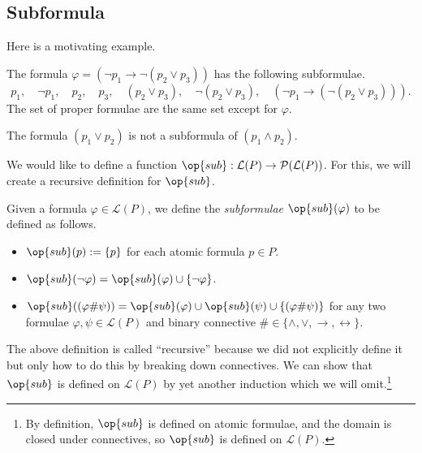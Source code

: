 \subsection{Subformula}
Here is a motivating example.
\begin{example}
	The formula $\varphi=(\lnot p_1\to\lnot(p_2\lor p_3))$ has the following subformulae.
	\[p_1,\quad\lnot p_1,\quad p_2,\quad p_3,\quad(p_2\lor p_3),\quad\lnot(p_2\lor p_3),\quad(\lnot p_1\to(\lnot(p_2\lor p_3))).\]
	The set of proper formulae are the same set except for $\varphi$.
\end{example}
\begin{nex}
	The formula $(p_1\lor p_2)$ is not a subformula of $(p_1\land p_2)$.
\end{nex}
We would like to define a function $\op{sub}:\mathcal L(P)\to\mathcal P(\mathcal L(P))$. For this, we will create a recursive definition for $\op{sub}$.
\begin{definition}[Subformula]
	Given a formula $\varphi\in\mathcal L(P)$, we define the \textit{subformulae} $\op{sub}(\varphi)$ to be defined as follows.
	\begin{itemize}
		\item $\op{sub}(p):=\{p\}$ for each atomic formula $p\in P$.
		\item $\op{sub}(\lnot\varphi)=\op{sub}(\varphi)\cup\{\lnot\varphi\}$.
		\item $\op{sub}((\varphi\#\psi))=\op{sub}(\varphi)\cup\op{sub}(\psi)\cup\{(\varphi\#\psi)\}$ for any two formulae $\varphi,\psi\in\mathcal L(P)$ and binary connective $\#\in\{\land,\lor,\to,\leftrightarrow\}$.
	\end{itemize}
\end{definition}
The above definition is called ``recursive'' because we did not explicitly define it but only how to do this by breaking down connectives. We can show that $\op{sub}$ is defined on $\mathcal L(P)$ by yet another induction which we will omit.\footnote{By definition, $\op{sub}$ is defined on atomic formulae, and the domain is closed under connectives, so $\op{sub}$ is defined on $\mathcal L(P)$.}

